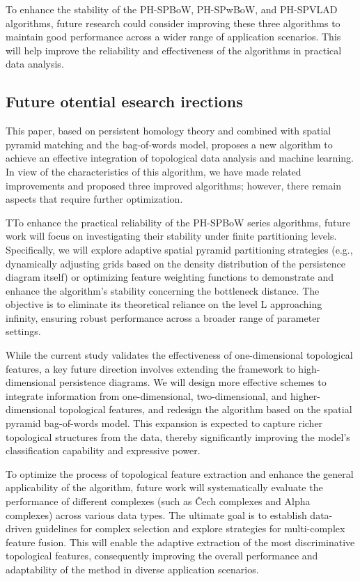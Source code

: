 \documentclass[5GeSdc,ASOC,numref,printGA,printHL,CASflow,nocrossmark,longtitle,PROOF]{/usr/local/texlive/iTemplates/01-Templates/01-Els-Jnl/01-Standard_Templates/V1/ELS_MDL5-V1-6}
\begin{document}
\begin{articlestyle}
To enhance the stability of the PH-SPBoW, PH-SPwBoW, and PH-SPVLAD algorithms, future research could consider improving these three algorithms to maintain good performance across a wider range of application scenarios. This will help improve the reliability and effectiveness of the algorithms in practical data analysis.

\subsection{Future otential esearch irections}\label{sec6.2}

{
This paper, based on persistent homology theory and combined with spatial pyramid matching and the bag-of-words model, proposes a new algorithm to achieve an effective integration of topological data analysis and machine learning. In view of the characteristics of this algorithm, we have made related improvements and proposed three improved algorithms; however, there remain aspects that require further optimization.
}

{
TTo enhance the practical reliability of the PH-SPBoW series algorithms, future work will focus on investigating their stability under finite partitioning levels. Specifically, we will explore adaptive spatial pyramid partitioning strategies (e.g., dynamically adjusting grids based on the density distribution of the persistence diagram itself) or optimizing feature weighting functions to demonstrate and enhance the algorithm's stability concerning the bottleneck distance. The objective is to eliminate its theoretical reliance on the level L approaching infinity, ensuring robust performance across a broader range of parameter settings.
}

{
While the current study validates the effectiveness of one-dimensional topological features, a key future direction involves extending the framework to high-dimensional persistence diagrams. We will design more effective schemes to integrate information from one-dimensional, two-dimensional, and higher-dimensional topological features, and redesign the algorithm based on the spatial pyramid bag-of-words model. This expansion is expected to capture richer topological structures from the data, thereby significantly improving the model's classification capability and expressive power.
}

{
To optimize the process of topological feature extraction and enhance the general applicability of the algorithm, future work will systematically evaluate the performance of different complexes (such as \v{C}ech complexes and Alpha complexes) across various data types. The ultimate goal is to establish data-driven guidelines for complex selection and explore strategies for multi-complex feature fusion. This will enable the adaptive extraction of the most discriminative topological features, consequently improving the overall performance and adaptability of the method in diverse application scenarios.
}


\end{articlestyle}
\end{document}
